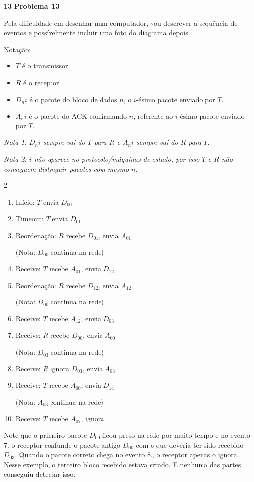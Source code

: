 \documentclass{article}
\newcounter{exe-list}
\newenvironment{exe}[2][Problema]
    {\newcommand{\opt}{(Opcional)}%
    \newcommand{\sketch}[1]{{\bfseries Rascunho:} ##1}%
    \medskip\par\noindent\ifthenelse{\equal{#1}{}}
        {\textbf{\large #2}}
        {\textbf{\large #1~#2}}%
    \medskip\par\noindent}
    {\medskip}
\begin{document}
\begin{exe}{13}
    Pela dificuldade em desenhar num computador,
    vou descrever a sequência de eventos e
    possívelmente incluir uma foto do diagrama depois.

    Notação:
    \begin{itemize}
        \item \(T\) é o transmissor
        \item \(R\) é o receptor
        \item \(D_ni\) é o pacote do bloco de dados \(n\),
            o \(i\)-ésimo pacote enviado por \(T\).
        \item \(A_ni\) é o pacote do ACK confirmando \(n\),
            referente ao \(i\)-ésimo pacote enviado por \(T\).
    \end{itemize}
    \par\textit{Nota 1:
        \(D_ni\) sempre vai do \(T\) para \(R\) e
        \(A_ni\) sempre vai do \(R\) para \(T\).}
    \par\textit{Nota 2:
        \(i\) não aparece no protocolo/máquinas de estado,
        por isso \(T\) e \(R\) não conseguem
        distinguir pacotes com mesmo \(n\).}

    \begin{multicols}{2}
    \begin{enumerate}
        \item Início: \(T\) envia \(D_00\)
        \item Timeout: \(T\) envia \(D_01\)
        \item Reordenação: \(R\) recebe \(D_01\), envia \(A_01\)
            \par (Nota: \(D_00\) continua na rede)
        \item Receive: \(T\) recebe \(A_01\), envia \(D_12\)
        \item Reordenação: \(R\) recebe \(D_12\), envia \(A_12\)
            \par (Nota: \(D_00\) continua na rede)
        \item Receive: \(T\) recebe \(A_12\), envia \(D_03\)
        \item Receive: \(R\) recebe \(D_00\), envia \(A_00\)
            \par (Nota: \(D_03\) continua na rede)
        \item Receive: \(R\) ignora \(D_03\), envia \(A_03\)
        \item Receive: \(T\) recebe \(A_00\), envia \(D_14\)
            \par (Nota: \(A_03\) continua na rede)
        \item Receive: \(T\) recebe \(A_03\), ignora
    \end{enumerate}
    \end{multicols}
    Note que o primeiro pacote \(D_00\) ficou
    preso na rede por muito tempo e
    no evento \(7.\) o receptor
    confunde o pacote antigo \(D_00\)
    com o que deveria ter sido recebido \(D_03\).
    Quando o pacote correto chega no evento \(8.\),
    o receptor apenas o ignora.
    Nesse exemplo, o terceiro bloco recebido estava errado.
    E nenhuma das partes conseguiu detectar isso.
\end{exe}
\end{document}
